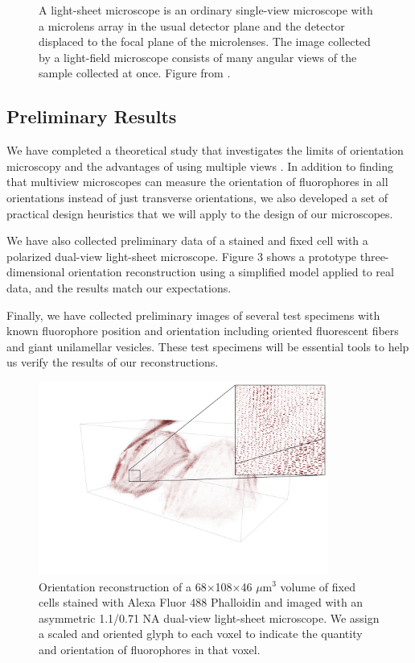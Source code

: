 \documentclass[12pt]{article}
\begin{document}
\begin{figure}[t]
\begin{minipage}{.45\textwidth}
  \caption{A light-sheet microscope is an ordinary single-view microscope with a
    microlens array in the usual detector plane and the detector displaced to
    the focal plane of the microlenses. The image collected by a light-field
    microscope consists of many angular views of the sample collected at
    once. Figure from \cite{levoy2006}.}
  \label{fig:test2}
\end{minipage}
\end{figure}

\subsection*{Preliminary Results}
We have completed a theoretical study that investigates the limits of
orientation microscopy and the advantages of using multiple views
\cite{chandler17}. In addition to finding that multiview microscopes can measure
the orientation of fluorophores in all orientations instead of just transverse
orientations, we also developed a set of practical design heuristics that we
will apply to the design of our microscopes.

We have also collected preliminary data of a stained and fixed cell with a
polarized dual-view light-sheet microscope. Figure 3 shows a prototype
three-dimensional orientation reconstruction using a simplified model applied to
real data, and the results match our expectations.

Finally, we have collected preliminary images of several test specimens with
known fluorophore position and orientation including oriented fluorescent fibers
and giant unilamellar vesicles. These test specimens will be essential tools to
help us verify the results of our reconstructions.

\begin{figure}[t]
\centering
  \includegraphics[width=0.85\textwidth, interpolate=true, trim={6em 4em 2em 0em}]{figs/inset}
  \caption{Orientation reconstruction of a 68$\times$108$\times$46 $\mu$m${}^3$
    volume of fixed cells stained with Alexa Fluor 488 Phalloidin and imaged
    with an asymmetric 1.1/0.71 NA dual-view light-sheet microscope. We assign a
    scaled and oriented glyph to each voxel to indicate the quantity and
    orientation of fluorophores in that voxel.}
  \label{fig:test1}
\end{figure}
\end{document}
